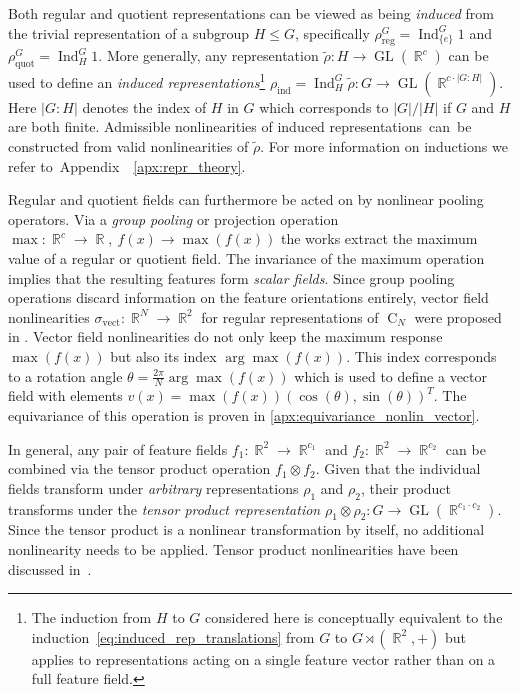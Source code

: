 \documentclass{article}
\newcommand{\apx}{Appendix\xspace
}
\DeclareMathOperator*{\R}{\mathbb{R}}
\newcommand{\GL}[1]{\ensuremath{\operatorname{GL}(#1)}}
\newcommand{\CN}{\ensuremath{\operatorname{C}_{\!N}}}
\begin{document}
Both regular and quotient representations can be viewed as being \textit{induced} from the trivial representation of a subgroup $H\leq G$, specifically
$\rho_\text{reg}^G  = \operatorname{Ind}_{\{e\}}^G1$ and
$\rho_\text{quot}^G = \operatorname{Ind}_{  H  }^G1$.
More generally, any representation $\tilde{\rho}:H\to\GL{\R^c}$ can be used to define an \emph{induced representations}\footnote{
    The induction from $H$ to $G$ considered here is conceptually equivalent to the induction~\eqref{eq:induced_rep_translations} from $G$ to $G\rtimes(\R^2,+)$ but applies to representations acting on a single feature vector rather than on a full feature field.
}
$\rho_\text{ind} = \operatorname{Ind}_H^G \tilde{\rho}:G\to\GL{\R^{c\cdot|G:H|}}$.
Here $|G:H|$ denotes the index of $H$ in $G$ which corresponds to $|G|/|H|$ if $G$ and $H$ are both finite.
Admissible nonlinearities of induced \mbox{representations can be} constructed from valid nonlinearities of $\tilde{\rho}$.
For more information on inductions we refer \mbox{to \apx~\ref{apx:repr_theory}.}

Regular and quotient fields can furthermore be acted on by nonlinear pooling operators.
Via a \emph{group pooling} or projection operation $\max:\R^c\to\R,\ f(x)\to\max(f(x))$ the works \cite{Cohen2016-GCNN,Weiler2018-STEERABLE,bekkers2018roto,Worrall2018-CUBENET,winkels3DGCNNsPulmonary2018} extract the maximum value of a regular or quotient field.
The invariance of the maximum operation implies that the resulting features form \emph{scalar fields}.
Since group pooling operations discard information on the feature orientations entirely, vector field nonlinearities $\sigma_\text{vect}:\R^N\to\R^2$ for regular representations of $\CN$ were proposed in \cite{Marcos2017-VFN}.
Vector field nonlinearities do not only keep the maximum response $\max(f(x))$ but also its index $\arg\max(f(x))$.
This index corresponds to a rotation angle $\theta=\frac{2\pi}{N}\arg\max(f(x))$ which is used to define a vector field with elements $v(x)=\max(f(x))(\cos(\theta),\sin(\theta))^T$.
The equivariance of this operation is proven in \ref{apx:equivariance_nonlin_vector}.


In general, any pair of feature fields $f_1:\R^2\to\R^{c_1}$ and $f_2:\R^2\to\R^{c_2}$ can be combined via the tensor product operation $f_1\otimes f_2$.
Given that the individual fields transform under \emph{arbitrary} representations $\rho_1$ and $\rho_2$, their product transforms under the \textit{tensor product representation} $\rho_1\!\otimes\!\rho_2:G\to\GL{\R^{c_1\cdot c_2}}$.
Since the tensor product is a nonlinear transformation by itself, no additional nonlinearity needs to be applied.
Tensor product nonlinearities have been discussed in~\cite{Kondor2018-NBN,3d_steerableCNNs,kondorClebschGordanNets2018,anderson2019cormorant}.
\end{document}
